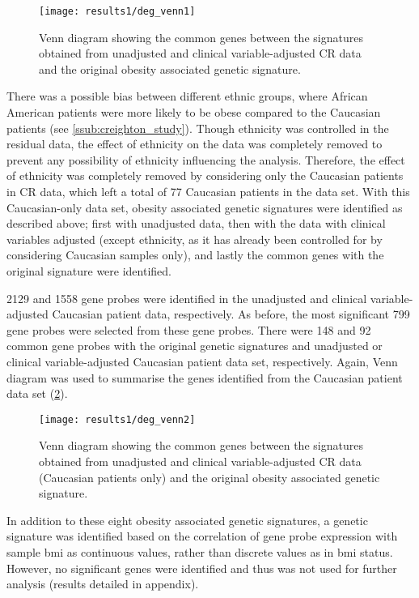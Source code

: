 \begin{figure}[htp!]
	\centering
	\texttt{[image: results1/deg\_venn1]}
	\caption[Veen diagram of the \glspl{deg} identified from CR data (all samples)]{Venn diagram showing the common genes between the signatures obtained from unadjusted and clinical variable-adjusted CR data and the original obesity associated genetic signature.}
	\label{fig:venn1}
\end{figure}

\noindent
There was a possible bias between different ethnic groups, where African American patients were more likely to be obese compared to the Caucasian patients (see \cref{ssub:creighton_study}).
Though ethnicity was controlled in the residual data, the effect of ethnicity on the data was completely removed to prevent any possibility of ethnicity influencing the analysis.
Therefore, the effect of ethnicity was completely removed by considering only the Caucasian patients in CR data, which left a total of 77 Caucasian patients in the data set.
With this Caucasian-only data set, obesity associated genetic signatures were identified as described above; first with unadjusted data, then with the data with clinical variables adjusted (except ethnicity, as it has already been controlled for by considering Caucasian samples only), and lastly the common genes with the original signature were identified.

2129 and 1558 gene probes were identified in the unadjusted and clinical variable-adjusted Caucasian patient data, respectively.
As before, the most significant 799 gene probes were selected from these gene probes.
There were 148 and 92 common gene probes with the original genetic signatures and unadjusted or clinical variable-adjusted Caucasian patient data set, respectively.
Again, Venn diagram was used to summarise the genes identified from the Caucasian patient data set (\cref{fig:venn2}).
\\

\begin{figure}[htp!]
	\centering
	\texttt{[image: results1/deg\_venn2]}
	\caption[Summary of the \glspl{deg} identified from CR data (Caucasian patient data)]{Venn diagram showing the common genes between the signatures obtained from unadjusted and clinical variable-adjusted CR data (Caucasian patients only) and the original obesity associated genetic signature.}
	\label{fig:venn2}
\end{figure}

\noindent
In addition to these eight obesity associated genetic signatures, a genetic signature was identified based on the correlation of gene probe expression with sample \gls{bmi} as continuous values, rather than discrete values as in \gls{bmi} status.
However, no significant genes were identified and thus was not used for further analysis (results detailed in appendix).

